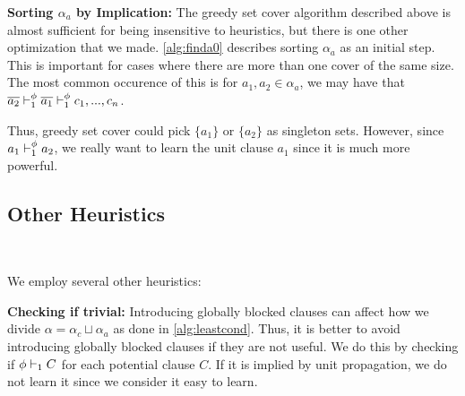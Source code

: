 \noindent \textbf{Sorting $\alpha_a$ by Implication:}%
The greedy set cover algorithm described above is almost sufficient for being insensitive to heuristics, but there is one other optimization that we made. \autoref{alg:finda0} describes sorting $\alpha_a$ as an initial step. This is important for cases where there are more than one cover of the same size. The most common occurence of this is for $a_1, a_2 \in \alpha_a$, we may have that $\overline{a_2} \vdash_1^\phi \overline{a_1} \vdash_1^\phi c_1, ..., c_n$. 

Thus, greedy set cover could pick $\{a_1\}$ or $\{a_2\}$ as singleton sets. However, since $a_1 \vdash_1^\phi a_2$, we really want to learn the unit clause $a_1$ since it is much more powerful.

\subsection{Other Heuristics}~\label{subsec:heuristics}

We employ several other heuristics:

\noindent \textbf{Checking if trivial:} Introducing globally blocked clauses can affect how we divide $\alpha = \alpha_c \sqcup \alpha_a$ as done in \autoref{alg:leastcond}. Thus, it is better to avoid introducing globally blocked clauses if they are not useful. We do this by checking if $\phi \vdash_1 C$ for each potential clause $C$. If it is implied by unit propagation, we do not learn it since we consider it easy to learn.

